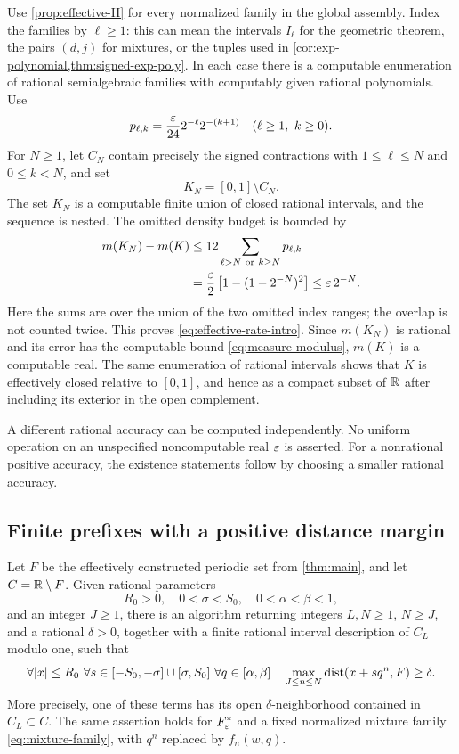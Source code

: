 Use \cref{prop:effective-H} for every normalized family in the global
assembly. Index the families by $\ell\ge1$: this can mean the intervals
$I_\ell$ for the geometric theorem, the pairs $(d,j)$ for mixtures,
or the tuples used in \cref{cor:exp-polynomial,thm:signed-exp-poly}. In each case there
is a computable enumeration of rational semialgebraic families with
computably given rational polynomials. Use
\[
 p_{\ell,k}=\frac{\varepsilon}{24}2^{-\ell}2^{-(k+1)}
 \quad(\ell\ge1,\ k\ge0).
\]
For $N\ge1$, let $C_N$ contain precisely the signed contractions with
$1\le\ell\le N$ and $0\le k<N$, and set
\begin{equation}\label{eq:KN}
 K_N=[0,1]\setminus C_N.
\end{equation}
The set $K_N$ is a computable finite union of closed rational intervals,
and the sequence is nested. The omitted density budget is bounded by
\begin{align}
 m(K_N)-m(K)
 &\le12\sum_{\ell>N\ \mathrm{or}\ k\ge N}p_{\ell,k}\notag\\
 &=\frac{\varepsilon}2\left[1-(1-2^{-N})^2\right]
 \le\varepsilon\,2^{-N}.
 \label{eq:measure-modulus}
\end{align}
Here the sums are over the union of the two omitted index ranges;
the overlap is not counted twice. This proves
\eqref{eq:effective-rate-intro}. Since $m(K_N)$ is rational and its
error has the computable bound \eqref{eq:measure-modulus}, $m(K)$
is a computable real. The same enumeration of rational intervals
shows that $K$ is effectively closed relative to $[0,1]$, and hence
as a compact subset of $\mathbb R$ after including its exterior in the
open complement.

A different rational accuracy can be computed independently. No
uniform operation on an unspecified noncomputable real $\varepsilon$ is
asserted. For a nonrational positive accuracy, the existence statements
follow by choosing a smaller rational accuracy.

\subsection{Finite prefixes with a positive distance margin}

\begin{theorem}\label{thm:certificates}
Let $F$ be the effectively constructed periodic set from
\cref{thm:main}, and let $C=\mathbb R\setminus F$. Given rational parameters
\[
 R_0>0,\quad 0<\sigma<S_0,\quad 0<\alpha<\beta<1,
\]
and an integer $J\ge1$, there is an algorithm returning integers
$L,N\ge1$, $N\ge J$, and a rational $\delta>0$, together with a
finite rational interval description of $C_L$ modulo one, such that
\begin{equation}\label{eq:robust-certificate}
 \forall |x|\le R_0\ \forall s\in[-S_0,-\sigma]\cup[\sigma,S_0]
 \ \forall q\in[\alpha,\beta]
 \quad \max_{J\le n\le N}\operatorname{dist}(x+sq^n,F)\ge\delta.
\end{equation}
More precisely, one of these terms has its open $\delta$-neighborhood
contained in $C_L\subset C$.
The same assertion holds for $F^*_\varepsilon$ and a fixed normalized
mixture family \eqref{eq:mixture-family}, with $q^n$ replaced by
$f_n(w,q)$.
\end{theorem}

